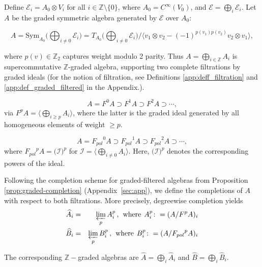 \documentclass[a4paper,12pt]{amsart}
\newcommand{\beq}{\begin{eqnarray}}
\newcommand{\eeq}{\end{eqnarray}}
\newcommand{\cI}{{\mathcal I}}
\newcommand{\cE}{{\mathcal E}}
\newcommand{\Z}{{\mathbb Z}}
\begin{document}
\noindent
Define $\cE_i=A_0\otimes V_i$ for all $i\in\Z\setminus \{0\}$, where $A_0 = C^\infty(V_0)$, and $\cE=\bigoplus_{i}\cE_i$.
Let $A$ be the graded symmetric algebra generated by $\cE$ over $A_0$:

\[
A = \mathrm{Sym}_{A_0} \bigg( \bigoplus_{i \neq 0} \cE_i \bigg)
= T_{A_0} \bigg( \bigoplus_{i \neq 0} \cE_i \bigg) \Big/ \big\langle
v_1 \otimes v_2 - (-1)^{p(v_1)p(v_2)} v_2 \otimes v_1
\big\rangle,
\]

\noindent where $p(v) \in \mathbb{Z}_2$ captures weight modulo 2 parity. Thus $A = \bigoplus_{i \in \mathbb{Z}} A_i$ is supercommutative $\mathbb{Z}$-graded algebra, supporting two complete filtrations by graded ideals (for the notion of filtration, see Definitions \ref{app:deff_filtration} and \ref{app:def_graded_filtered} in the Appendix.).

\smallskip{}

\[
A = F^0 A \supset F^1 A \supset F^2 A \supset \cdots,
\]
via $F^p A = \langle \bigoplus_{i \geq p} A_i \rangle$, where the latter is the graded ideal generated by all homogeneous elements of weight $\ge p$. 

\smallskip{}

\[
A = {F_{pol}}^0 A \supset {F_{pol}}^1 A \supset {F_{pol}}^2 A \supset \cdots,
\]
where ${F_{pol}}^p A = \big(\cI\big)^p$ for $\cI=\langle \bigoplus_{i \ne 0} A_i \rangle$. Here, $\big(\cI\big)^p$ denotes the corresponding powers of the ideal.

\medskip\noindent Following the completion scheme for graded-filtered algebras from Proposition \ref{prop:graded-completion} (Appendix~\ref{sec:app}), we define the completions of $A$ with respect to both filtrations. More precisely, degreewise completion yields
\beq
\widehat{A}_i &=& \varprojlim_p A^p_i\,, \hspace{1.5mm}\mathrm{where}\hspace{1.5mm} A^p_i \colon = (A / F^p A)_i \\
\widehat{B}_i &=& \varprojlim_p B^p_i\,, \hspace{1.5mm}\mathrm{where}\hspace{1.5mm} B^p_i \colon = (A / {F_{pol}}^p A)_i
\eeq

\noindent The corresponding $\Z-$graded algebras are $\widehat{A}=\bigoplus_i \widehat{A}_i$ and $\widehat{B}=\bigoplus_i \widehat{B}_i$.
\end{document}
